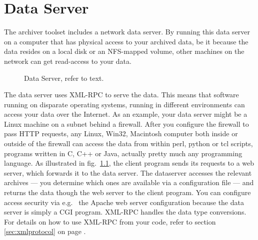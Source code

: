 \chapter{Data Server} \label{sec:dataserver}
The archiver toolset includes a network data server.
By running this data server on a computer that has
physical access to your archived data, be it because the data resides
on a local disk or an NFS-mapped volume, other machines
on the network can get read-access to your data.

\begin{figure}[htb]
\begin{center}
\end{center}
\caption{\label{fig:dataserver}Data Server, refer to text.}
\end{figure}

\noindent The data server uses XML-RPC to serve the data. This means that
software running on disparate operating systems, running in different
environments can access your data over the Internet. As an example,
your data server might be a Linux machine on a subnet behind a
firewall. After you configure the firewall to pass HTTP requests, any
Linux, Win32, Macintosh computer both inside or outside of the
firewall can access the data from within perl, python or tcl scripts,
programs written in C, C++ or Java, actually pretty much any programming
language. As illustrated in fig.~\ref{fig:dataserver}, the client
program sends its requests to a web server, which forwards it to the
data server. The dataserver accesses the relevant archives --- you
determine which ones are available via a configuration file --- and
returns the data though the web server to the client program.  You can
configure access security via e.g.~ the Apache web server
configuration because the data server is simply a CGI program.
XML-RPC handles the data type conversions. For details on how to use
XML-RPC from your code, refer to section \ref{sec:xmlprotocol} on page
\pageref{sec:xmlprotocol}.

